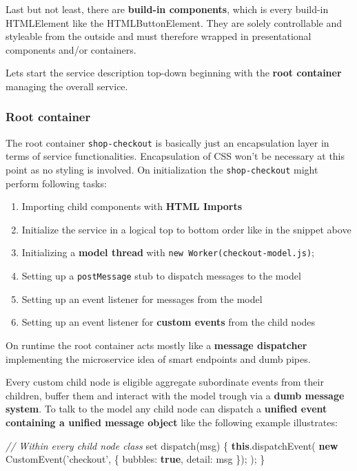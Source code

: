 \documentclass[]{article}
\newenvironment{Shaded}{}{}
\newcommand{\KeywordTok}[1]{\textcolor[rgb]{0.00,0.44,0.13}{\textbf{{#1}}}}
\newcommand{\DataTypeTok}[1]{\textcolor[rgb]{0.56,0.13,0.00}{{#1}}}
\newcommand{\StringTok}[1]{\textcolor[rgb]{0.25,0.44,0.63}{{#1}}}
\newcommand{\CommentTok}[1]{\textcolor[rgb]{0.38,0.63,0.69}{\textit{{#1}}}}
\newcommand{\OperatorTok}[1]{\textcolor[rgb]{0.40,0.40,0.40}{{#1}}}
\newcommand{\AttributeTok}[1]{\textcolor[rgb]{0.49,0.56,0.16}{{#1}}}
\newcommand{\NormalTok}[1]{{#1}}
\providecommand{\tightlist}{%
  \setlength{\itemsep}{0pt}\setlength{\parskip}{0pt}}
\begin{document}
Last but not least, there are \textbf{build-in components}, which is
every build-in HTMLElement like the HTMLButtonElement. They are solely
controllable and styleable from the outside and must therefore wrapped
in presentational components and/or containers.

Lets start the service description top-down beginning with the
\textbf{root container} managing the overall service.

\subsubsection{Root container}\label{root-container}

The root container \texttt{shop-checkout} is basically just an
encapsulation layer in terms of service functionalities. Encapsulation
of CSS won't be necessary at this point as no styling is involved. On
initialization the \texttt{shop-checkout} might perform following tasks:

\begin{enumerate}
\def\labelenumi{\arabic{enumi}.}
\tightlist
\item
  Importing child components with \textbf{HTML Imports}
\item
  Initialize the service in a logical top to bottom order like in the
  snippet above
\item
  Initializing a \textbf{model thread} with
  \texttt{new\ Worker(\textquotesingle{}checkout-model.js\textquotesingle{})};
\item
  Setting up a \texttt{postMessage} stub to dispatch messages to the
  model
\item
  Setting up an event listener for messages from the model
\item
  Setting up an event listener for \textbf{custom events} from the child
  nodes
\end{enumerate}

On runtime the root container acts mostly like a \textbf{message
dispatcher} implementing the microservice idea of smart endpoints and
dumb pipes.

Every custom child node is eligible aggregate subordinate events from
their children, buffer them and interact with the model trough via a
\textbf{dumb message system}. To talk to the model any child node can
dispatch a \textbf{unified event containing a unified message object}
like the following example illustrates:

\begin{Shaded}
\begin{Highlighting}[]
\CommentTok{// Within every child node class}
\NormalTok{set }\AttributeTok{dispatch}\NormalTok{(msg) }\OperatorTok{\{}
  \KeywordTok{this}\NormalTok{.}\AttributeTok{dispatchEvent}\NormalTok{(}
    \KeywordTok{new} \AttributeTok{CustomEvent}\NormalTok{(}\StringTok{'checkout'}\OperatorTok{,} \OperatorTok{\{}
      \DataTypeTok{bubbles}\OperatorTok{:} \KeywordTok{true}\OperatorTok{,}
      \DataTypeTok{detail}\OperatorTok{:} \NormalTok{msg}
    \OperatorTok{\}}\NormalTok{)}\OperatorTok{;}
  \NormalTok{)}\OperatorTok{;}
\OperatorTok{\}}
\end{Highlighting}
\end{Shaded}
\end{document}
